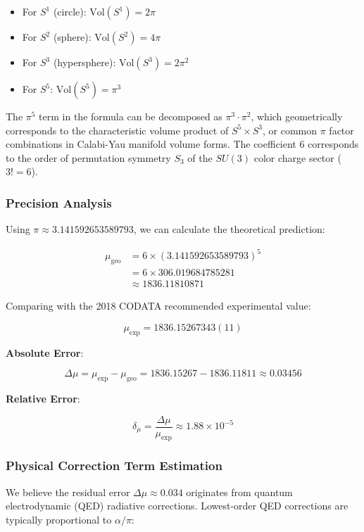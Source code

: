 \begin{itemize}
\item For $S^1$ (circle): $\text{Vol}(S^1) = 2\pi$
\item For $S^2$ (sphere): $\text{Vol}(S^2) = 4\pi$
\item For $S^3$ (hypersphere): $\text{Vol}(S^3) = 2\pi^2$
\item For $S^5$: $\text{Vol}(S^5) = \pi^3$
\end{itemize}

The $\pi^5$ term in the formula can be decomposed as $\pi^3 \cdot \pi^2$, which geometrically corresponds to the characteristic volume product of $S^5 \times S^3$, or common $\pi$ factor combinations in Calabi-Yau manifold volume forms. The coefficient $6$ corresponds to the order of permutation symmetry $S_3$ of the $SU(3)$ color charge sector ($3! = 6$).

\subsubsection{Precision Analysis}

Using $\pi \approx 3.141592653589793$, we can calculate the theoretical prediction:

\begin{align*}
\mu_{\text{geo}} &= 6 \times (3.141592653589793)^5 \\
&= 6 \times 306.019684785281 \\
&\approx 1836.11810871
\end{align*}

Comparing with the 2018 CODATA recommended experimental value:

\[\mu_{\text{exp}} = 1836.15267343(11)\]

\textbf{Absolute Error}:

\[\Delta \mu = \mu_{\text{exp}} - \mu_{\text{geo}} = 1836.15267 - 1836.11811 \approx 0.03456\]

\textbf{Relative Error}:

\[\delta_{\mu} = \frac{\Delta \mu}{\mu_{\text{exp}}} \approx 1.88 \times 10^{-5}\]

\subsubsection{Physical Correction Term Estimation}

We believe the residual error $\Delta \mu \approx 0.034$ originates from quantum electrodynamic (QED) radiative corrections. Lowest-order QED corrections are typically proportional to $\alpha/\pi$:

